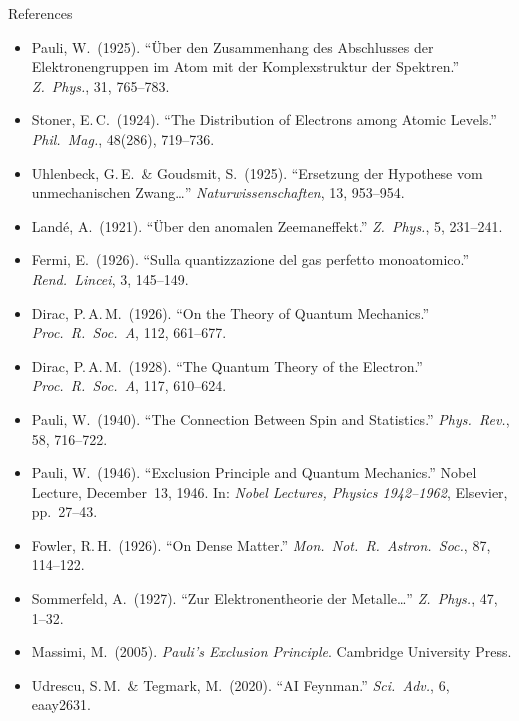 \documentclass[aspectratio=169,12pt]{beamer}
\begin{document}
\begin{frame}[allowframebreaks]{References}

\small
\begin{itemize}
  \item Pauli, W.\ (1925). ``\"{U}ber den Zusammenhang des Abschlusses der
    Elektronengruppen im Atom mit der Komplexstruktur der Spektren.''
    \textit{Z.\ Phys.}, 31, 765--783.
  \item Stoner, E.\,C.\ (1924). ``The Distribution of Electrons among
    Atomic Levels.''
    \textit{Phil.\ Mag.}, 48(286), 719--736.
  \item Uhlenbeck, G.\,E.\ \& Goudsmit, S.\ (1925).
    ``Ersetzung der Hypothese vom unmechanischen Zwang\ldots''
    \textit{Naturwissenschaften}, 13, 953--954.
  \item Land\'{e}, A.\ (1921). ``\"{U}ber den anomalen Zeemaneffekt.''
    \textit{Z.\ Phys.}, 5, 231--241.
  \item Fermi, E.\ (1926). ``Sulla quantizzazione del gas perfetto
    monoatomico.'' \textit{Rend.\ Lincei}, 3, 145--149.
  \item Dirac, P.\,A.\,M.\ (1926). ``On the Theory of Quantum Mechanics.''
    \textit{Proc.\ R.\ Soc.\ A}, 112, 661--677.
  \item Dirac, P.\,A.\,M.\ (1928). ``The Quantum Theory of the Electron.''
    \textit{Proc.\ R.\ Soc.\ A}, 117, 610--624.
  \item Pauli, W.\ (1940). ``The Connection Between Spin and Statistics.''
    \textit{Phys.\ Rev.}, 58, 716--722.
  \item Pauli, W.\ (1946). ``Exclusion Principle and Quantum Mechanics.''
    Nobel Lecture, December~13, 1946.
    In: \textit{Nobel Lectures, Physics 1942--1962}, Elsevier, pp.~27--43.
  \item Fowler, R.\,H.\ (1926). ``On Dense Matter.''
    \textit{Mon.\ Not.\ R.\ Astron.\ Soc.}, 87, 114--122.
  \item Sommerfeld, A.\ (1927). ``Zur Elektronentheorie der Metalle\ldots''
    \textit{Z.\ Phys.}, 47, 1--32.
  \item Massimi, M.\ (2005). \textit{Pauli's Exclusion Principle}.
    Cambridge University Press.
  \item Udrescu, S.\,M.\ \& Tegmark, M.\ (2020). ``AI Feynman.''
    \textit{Sci.\ Adv.}, 6, eaay2631.
\end{itemize}

\end{frame}

\end{document}
